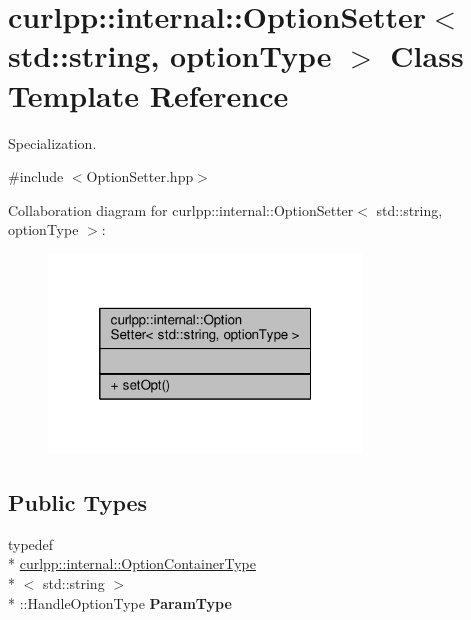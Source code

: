 \hypertarget{classcurlpp_1_1internal_1_1OptionSetter_3_01std_1_1string_00_01optionType_01_4}{\section{curlpp\-:\-:internal\-:\-:Option\-Setter$<$ std\-:\-:string, option\-Type $>$ Class Template Reference}
\label{classcurlpp_1_1internal_1_1OptionSetter_3_01std_1_1string_00_01optionType_01_4}
}


Specialization.  




{\ttfamily \#include $<$Option\-Setter.\-hpp$>$}



Collaboration diagram for curlpp\-:\-:internal\-:\-:Option\-Setter$<$ std\-:\-:string, option\-Type $>$\-:\nopagebreak
\begin{figure}[H]
\begin{center}
\leavevmode
\includegraphics[width=236pt]{classcurlpp_1_1internal_1_1OptionSetter_3_01std_1_1string_00_01optionType_01_4__coll__graph}
\end{center}
\end{figure}
\subsection*{Public Types}
\begin{DoxyCompactItemize}
\item 
\hypertarget{classcurlpp_1_1internal_1_1OptionSetter_3_01std_1_1string_00_01optionType_01_4_ab4068e8bc5df3632d0f57da2e6318f6b}{typedef \\*
\hyperlink{structcurlpp_1_1internal_1_1OptionContainerType}{curlpp\-::internal\-::\-Option\-Container\-Type}\\*
$<$ std\-::string $>$\\*
\-::Handle\-Option\-Type {\bfseries Param\-Type}}\label{classcurlpp_1_1internal_1_1OptionSetter_3_01std_1_1string_00_01optionType_01_4_ab4068e8bc5df3632d0f57da2e6318f6b}

\end{DoxyCompactItemize}
